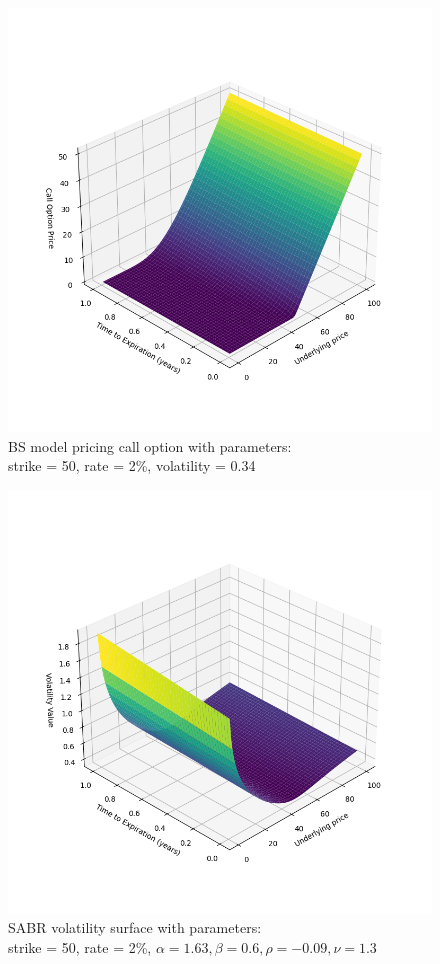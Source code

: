 \documentclass[a4paper,fleqn,12pt]{extarticle}
\begin{document}
	\begin{figure}[ht]
		\centering
		\includegraphics[width=1\textwidth]{pngs/direct.png}
		\caption{BS model pricing call option with parameters: \\
		strike = 50, rate = 2\%, volatility = 0.34}
	\end{figure}
	\begin{figure}[ht]
		\centering
		\includegraphics[width=1\textwidth]{pngs/volatility_surface.png}
		\caption{SABR volatility surface with parameters: \\
		strike = 50, rate = 2\%, $\alpha = 1.63, \beta = 0.6, \rho = -0.09, \nu = 1.3$}
	\end{figure}
\end{document}
